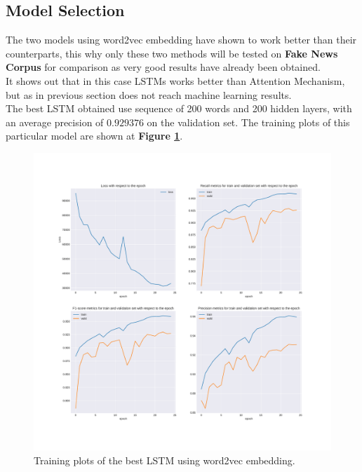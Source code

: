 \subsection{Model Selection}
The two models using word2vec embedding have shown to work better than their counterparts, this why only these two methods will be tested on \textbf{Fake News Corpus} for comparison as very good results have already been obtained. \\
It shows out that in this case LSTMs works better than Attention Mechanism, but as in previous section does not reach machine learning results. \\
The best LSTM obtained use sequence of 200 words and 200 hidden layers, with an average precision of $0.929376$ on the validation set. The training plots of this particular model are shown at \textbf{Figure \ref{chap4:fig:lstm5.1}}.\\
\begin{figure}
 \centering
 \includegraphics[width=\textwidth]{images/chapitre4/lstm5}
 \caption{Training plots of the best LSTM using word2vec embedding.}
 \label{chap4:fig:lstm5.1}
\end{figure} 

